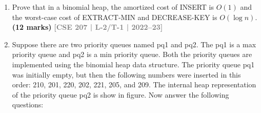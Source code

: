 \documentclass[12pt]{article}
\newcommand{\yr}[1]{\hfill\textcolor{gray}{\small\textbf{[#1]}}}
\newcommand{\mk}[1]{\textcolor{orange!70!black}{\small\textbf{(#1 marks)}}}
\begin{document}
\begin{enumerate}
\item Prove that in a binomial heap, the amortized cost of INSERT is $O(1)$ and the worst-case cost of EXTRACT-MIN and DECREASE-KEY is $O(\log n)$.
\mk{12} \yr{CSE 207 | L-2/T-1 | 2022--23}


\item Suppose there are two priority queues named pq1 and pq2. The pq1 is a max priority queue and pq2 is a min priority queue. Both the priority queues are implemented using the binomial heap data structure. The priority queue pq1 was initially empty, but then the following numbers were inserted in this order: 210, 201, 220, 202, 221, 205, and 209. The internal heap representation of the priority queue pq2 is show in figure. Now answer the following questions:

\vspace{0.5cm}

\begin{center}
\end{center}
\end{enumerate}
\end{document}
